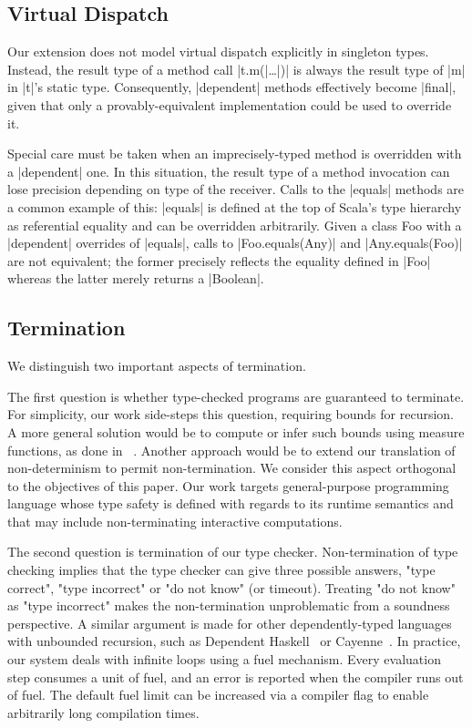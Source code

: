 \subsection{Virtual Dispatch}

Our extension does not model virtual dispatch explicitly in singleton types.
Instead, the result type of a method call |t.m(|\ldots{}|)| is always the result type of |m| in |t|'s static type.
Consequently, |dependent| methods effectively become |final|, given that only a provably-equivalent implementation could be used to override it.

Special care must be taken when an imprecisely-typed method is overridden with a |dependent| one.
In this situation, the result type of a method invocation can lose precision depending on type of the receiver.
Calls to the |equals| methods are a common example of this: |equals| is defined at the top of Scala's type hierarchy as referential equality and can be overridden arbitrarily.
Given a class Foo with a |dependent| overrides of |equals|, calls to |Foo.equals(Any)| and |Any.equals(Foo)| are not equivalent; the former precisely reflects the equality defined in |Foo| whereas the latter merely returns a |Boolean|.

\subsection{Termination}

We distinguish two important aspects of termination.

The first question is whether type-checked programs are guaranteed to terminate.
For simplicity, our work side-steps this question, requiring bounds for recursion.
A more general solution would be to compute or infer such bounds using measure functions, as done in \FR~\citep{hamza2019system}.
Another approach would be to extend our translation of non-determinism to permit non-termination.
We consider this aspect orthogonal to the objectives of this paper.
Our work targets general-purpose programming language whose type safety is defined with regards to its runtime semantics and that may include non-terminating interactive computations.

The second question is termination of our type checker.
Non-termination of type checking implies that the type checker can give three possible answers, "type correct", "type incorrect" or "do not know" (or timeout).
Treating "do not know" as "type incorrect" makes the non-termination unproblematic from a soundness perspective.
A similar argument is made for other dependently-typed languages with unbounded recursion, such as Dependent Haskell~\citep{eisenberg2016dependent} or Cayenne~\citep{augustsson1998cayenne}.
In practice, our system deals with infinite loops using a fuel mechanism.
Every evaluation step consumes a unit of fuel, and an error is reported when the compiler runs out of fuel.
The default fuel limit can be increased via a compiler flag to enable arbitrarily long compilation times.

